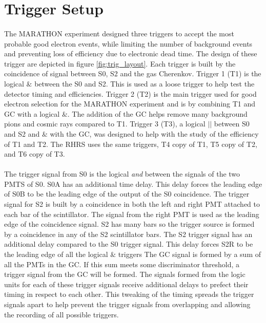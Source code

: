 \section{Trigger Setup}\label{sec:Trig}
\paragraph{} The MARATHON experiment designed three triggers to accept the most probable good electron events, while limiting the number of background events and preventing loss of efficiency due to electronic dead time. The design of these trigger are depicted in figure \ref{fig:trig_layout}. Each trigger is built by the coincidence of signal between S0, S2 and the gas Cherenkov.  Trigger 1 (T1) is the logical $\&$ between the S0 and S2. This is used as a loose trigger to help test the detector timing and efficiencies.  Trigger 2 (T2) is the main trigger used for good electron selection for the MARATHON experiment and is by  combining T1 and GC with a logical $\&$. The addition of the GC helps remove many background pions and cosmic rays compared to T1. Trigger 3 (T3), a logical $||$ between S0 and S2 and $\&$ with the GC, was designed to help with the study of the efficiency of T1 and T2. The RHRS uses the same triggers, T4 copy of T1, T5 copy of T2, and T6 copy of T3.

\paragraph{}The trigger signal from  S0 is the logical {\em{and}} between the signals of the two PMTS of S0. S0A has an additional time delay. This delay forces the leading edge of S0B to be the leading edge of the output of the S0 coincidence. The trigger signal for S2 is built by a coincidence in both the left and right PMT attached to each bar of the scintillator. The signal from the right PMT is used as the leading edge of the coincidence signal. S2 has many bars so the trigger source is formed by a coincidence in any of the S2 scintillator bars. The S2 trigger signal has an additional delay compared to the S0 trigger signal. This delay forces S2R to be the leading edge of all the logical $\&$ triggers The GC signal is formed by a sum of all the PMTs in the GC. If this sum meets some discriminator threshold, a trigger signal from the GC will be formed. The signals formed from the logic units for each of these trigger signals receive additional delays to prefect their timing in respect to each other. This tweaking of the timing spreads the trigger signals apart to help prevent the trigger signals from overlapping and allowing the recording of all possible triggers. 
 
